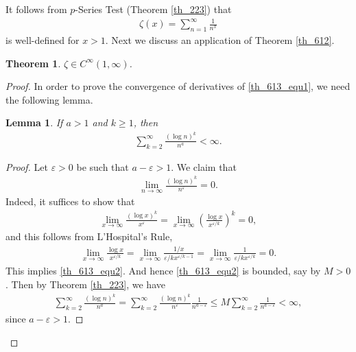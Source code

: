 \documentclass[11pt]{book}
\newtheorem{theorem}{Theorem}[chapter]
\newtheorem{lemma}{Lemma}[chapter]
\theoremstyle{definition}
\numberwithin{equation}{chapter}
\begin{document}
\medskip

It follows from $p$-Series Test (Theorem \ref{th_223}) that 
\begin{align}\label{th_613_equ1}
    \zeta(x) = \sum^\infty_{n=1} \frac{1}{n^x}
\end{align}
is well-defined for $x > 1$. Next we discuss an application of Theorem \ref{th_612}.

\medskip

\begin{theorem}
$\zeta \in C^\infty(1,\infty)$.
\end{theorem}
\begin{proof}
In order to prove the convergence of derivatives of \eqref{th_613_equ1}, we need the following lemma.

\medskip

\begin{lemma}\label{lemma_61}
If $a > 1$ and $k \geq 1$, then
\begin{align*}
    \sum^\infty_{k=2} \frac{(\log n)^k}{n^a} < \infty.
\end{align*}
\end{lemma}
\begin{proof}
Let $\varepsilon > 0$ be such that $a - \varepsilon > 1$. We claim that
\begin{align}\label{th_613_equ2}
    \lim_{n\to\infty} \frac{(\log n)^k}{n^\varepsilon} = 0.
\end{align}
Indeed, it suffices to show that
\begin{align*}
    \lim_{x\to\infty} \frac{(\log x)^k}{x^\varepsilon} = \lim_{x\to\infty} \left(\frac{\log x}{x^{\varepsilon/k}} \right)^k = 0,
\end{align*}
and this follows from L'Hospital's Rule, 
\begin{align*}
    \lim_{x\to\infty} \frac{\log x}{x^{\varepsilon/k}} = \lim_{x\to\infty} \frac{1/x}{\varepsilon/k x^{\varepsilon/k - 1}} = \lim_{x\to\infty} \frac{1}{\varepsilon/k x^{\varepsilon/k}} = 0.
\end{align*}
This implies \eqref{th_613_equ2}. And hence \eqref{th_613_equ2} is bounded, say by $M > 0$. Then by Theorem \ref{th_223}, we have
\begin{align*}
    \sum^\infty_{k=2} \frac{(\log n)^k}{n^a} = \sum^\infty_{k=2} \frac{(\log n)^k}{n^\varepsilon} \frac{1}{n^{a - \varepsilon}} \leq M \sum^\infty_{k=2} \frac{1}{n^{a - \varepsilon}} < \infty,
\end{align*}
since $a - \varepsilon > 1$.
\end{proof}


\end{proof}
\end{document}
